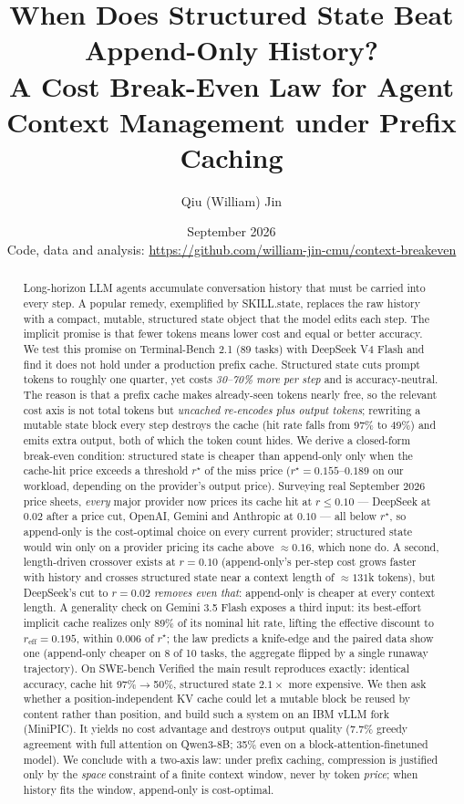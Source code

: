 \documentclass[11pt]{article}
\title{\textbf{When Does Structured State Beat Append-Only History?\\
A Cost Break-Even Law for Agent Context Management under Prefix Caching}}
\author{Qiu (William) Jin}
\date{September 2026\\[4pt]\small Code, data and analysis: \url{https://github.com/william-jin-cmu/context-breakeven}}
\begin{document}
\maketitle

\begin{abstract}
Long-horizon LLM agents accumulate conversation history that must be carried
into every step. A popular remedy, exemplified by SKILL.state, replaces the raw
history with a compact, mutable, structured state object that the model edits
each step. The implicit promise is that fewer tokens means lower cost and equal
or better accuracy. We test this promise on Terminal-Bench 2.1 (89 tasks) with
DeepSeek V4 Flash and find it does not hold under a production prefix cache.
Structured state cuts prompt tokens to roughly one quarter, yet costs
\emph{30--70\% more per step} and is accuracy-neutral. The reason is that a
prefix cache makes already-seen tokens nearly free, so the relevant cost axis is
not total tokens but \emph{uncached re-encodes plus output tokens}; rewriting a
mutable state block every step destroys the cache (hit rate falls from 97\% to
49\%) and emits extra output, both of which the token count hides. We derive a
closed-form break-even condition: structured state is cheaper than append-only
only when the cache-hit price exceeds a threshold $r^\star$ of the miss price
($r^\star = 0.155$--$0.189$ on our workload, depending on the provider's output
price). Surveying real September 2026 price sheets, \emph{every} major provider
now prices its cache hit at $r\le0.10$ --- DeepSeek at $0.02$ after a price cut,
OpenAI, Gemini and Anthropic at $0.10$ --- all below $r^\star$, so append-only is
the cost-optimal choice on every current provider; structured state would win
only on a provider pricing its cache above $\approx0.16$, which none do. A
second, length-driven crossover exists at $r=0.10$ (append-only's per-step cost
grows faster with history and crosses structured state near a context length of
$\approx131$k tokens), but DeepSeek's cut to $r=0.02$ \emph{removes even that}:
append-only is cheaper at every context length. A generality check on Gemini
3.5 Flash exposes a third input: its best-effort implicit cache realizes only
89\% of its nominal hit rate, lifting the effective discount to
$r_{\text{eff}}=0.195$, within $0.006$ of $r^\star$; the law predicts a knife-edge
and the paired data show one (append-only cheaper on 8 of 10 tasks, the
aggregate flipped by a single runaway trajectory). On SWE-bench Verified the
main result reproduces exactly: identical accuracy, cache hit 97\%$\to$50\%,
structured state $2.1\times$ more expensive. We then ask whether a
position-independent KV cache could let a mutable block be reused by content
rather than position, and build such a system on an IBM vLLM fork (MiniPIC). It
yields no cost advantage and destroys output quality (7.7\% greedy agreement
with full attention on Qwen3-8B; 35\% even on a block-attention-finetuned model).
We conclude with a two-axis law: under prefix caching, compression is justified
only by the \emph{space} constraint of a finite context window, never by token
\emph{price}; when history fits the window, append-only is cost-optimal.
\end{abstract}
\end{document}
